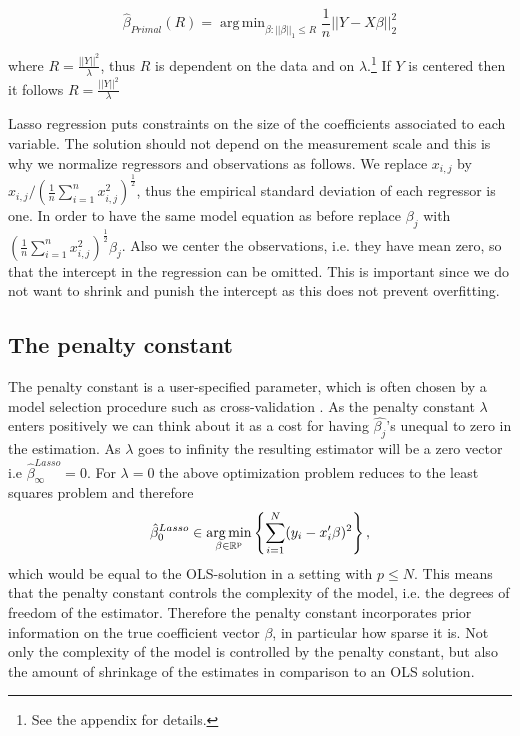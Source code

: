 \documentclass{article}
\theoremstyle{definition}
\DeclareMathOperator*{\argmin}{arg\,min}
\begin{document}
\begin{equation}
\hat{\beta}_{Primal}(R)=\argmin_{\beta:||\beta||_1\leq R} \frac{1}{n}||Y-X\beta||_2^2 \label{Primal}
\end{equation} 

\noindent where $R = \frac{||Y||^2}{\lambda}$, thus $R$ is dependent on the data and on $\lambda$.\footnote{See the appendix for details.} If $Y$ is centered then it follows $R = \frac{||Y||^2}{\lambda}$

Lasso regression puts constraints on the size of the coefficients associated to each variable. The solution should not depend on the measurement scale and this is why we normalize regressors and observations as follows. We replace $x_{i,j}$ by $x_{i,j}/ (\frac{1}{n} \sum_{i=1}^{n} x_{i,j}^2)^\frac{1}{2}$, thus the empirical standard deviation of each regressor is one. In order to have the same model equation as before replace $\beta_j$ with $(\frac{1}{n}\sum_{i=1}^{n} x_{i,j}^2)^\frac{1}{2} \beta_j$. Also we center the observations, i.e. they have mean zero, so that the intercept in the regression can be omitted. This is important since we do not want to shrink and punish the intercept as this does not prevent overfitting.

\subsection{The penalty constant}

The penalty constant is a user-specified parameter, which is often chosen by a model selection procedure such as cross-validation \citep{sparsity}.
As the penalty constant $\lambda$ enters positively we can think about it as a cost for having $\hat{\beta_j}$'s unequal to zero in the estimation. As $\lambda$ goes to infinity the resulting estimator will be a zero vector i.e $\hat{\beta}_{\infty}^{Lasso}=0$. For $\lambda=0$ the above optimization problem reduces to the least squares problem and therefore 
\begin{equation}
	\hat{\beta}_{0}^{Lasso}\in\argmin_{\beta \in\rm \mathbb{R}^p} \left  \{   \sum_{i=1}^{N}(y_{i}-x_{i}'\beta)^2\right \},
\end{equation}
which would be equal to the OLS-solution in a setting with $p\leq N$. This means that the penalty constant controls the complexity of the model, i.e. the degrees of freedom of the estimator. Therefore the penalty constant incorporates prior information on the true coefficient vector $\beta$, in particular how sparse it is. Not only the complexity of the model is controlled by the penalty constant, but also the amount of shrinkage of the estimates in comparison to an OLS solution. 
\end{document}
